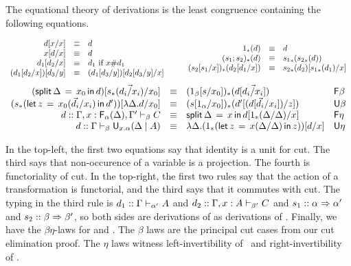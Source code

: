 The equational theory of derivations is the least congruence containing
the following equations.  
\begin{small}
\[
\begin{array}{rcll} 
\Cut{\D}{\Ident{x}}{x} & \deq & \D \\
\Cut{\Ident{x}}{\D}{x} & \deq & \D \\
\Cut{\D_1}{\D_2}{x} & \deq & \D_1 \text{ if $x \# \D_1$}\\
\Cut{(\Cut{\D_1}{\D_2}{x})}{\D_3}{y} & \deq & \Cut{(\Cut{\D_1}{\D_3}{y})}{\Cut{\D_2}{\D_3}{y}}{x}\\
\end{array}
\qquad
\begin{array}{rcll}
\Trd{1}{\D} & \deq & \D\\
\Trd{(s_1;s_2)}{\D} & \deq & \Trd{{s_1}}{\Trd{{s_2}}{\D}} \\
\Trd{(\subst{s_2}{s_1}{x})}{\Cut{\D_2}{\D_1}{x}} & \deq & \Cut{\Trd{{s_2}}{\D_2}}{\Trd{{s_1}}{\D_1}}{x} \\
\end{array}
\]
\[
\begin{array}{rcll}
\Cut{(\FLd{x_0}{\Delta}{\D})}{\FRd{}{s}{\vec{\D_i/x_i}}}{x_0} & \deq & \Trd{(1_\beta[s/x_0])}{\D[\vec{\D_i/x_i}]} & \dsd{F\beta} \\
\Cut{(\ULd{x_0}{}{s}{\vec{\D_i}/x_i}{z}{\D'})}{\URd{\Delta}{\D}}{x_0} & \deq & \Trd{(s[1_{\alpha}/{x_0}])}{\Cut{\D'}{(\D[{\vec{d_i}/x_i}])}{z}} & \dsd{U\beta} \\
\D :: \seq{\Gamma,x:\F{\alpha}{\Delta},\Gamma'}{\beta}{C} & \deq &
\FLd{x}{\Delta}{\Cut{\D}{\FRd{}{1}{\Delta/\Delta}}{x}} & \dsd{F\eta}\\
\D :: \seq{\Gamma}{\beta}{\U{x.\alpha}{\Delta}{A}} & \deq & \URd{\Delta}{\Cut{(\ULd{x}{}{1}{\Delta/\Delta}{z}{z})}{\D}{x}} & \dsd{U\eta}\\
\end{array}
\]
\end{small}

In the top-left, the first two equations say that identity is a unit for
cut.  The third says that non-occurence of a variable is a projection.
The fourth is functoriality of cut.  In the top-right, the first two
rules say that the action of a transformation is functorial, and the
third says that it commutes with cut.  The typing in the third rule is
$\D_1 :: \seq{\Gamma}{\alpha'}{A}$ and $\D_2 ::
\seq{\Gamma,x:A}{\beta'}{C}$ and $s_1 :: \alpha \spr \alpha'$ and $s_2
:: \beta \spr \beta'$, so both sides are derivations of as derivations
of .  Finally, we have the
$\beta\eta$-laws for  and .  The $\beta$ laws are the
principal cut cases from our cut elimination proof.  The $\eta$ laws
witness left-invertibility of \Fsymb\, and right-invertibility of
\Usymb.


